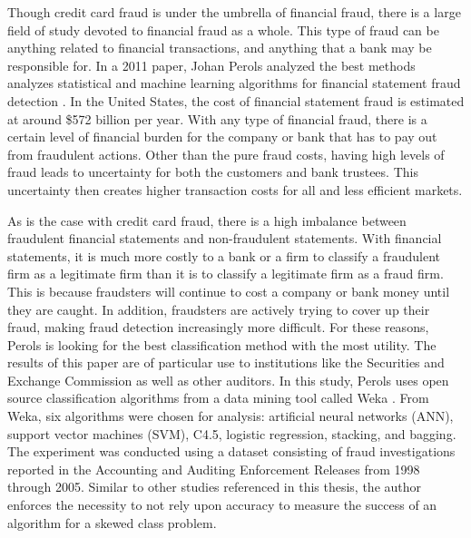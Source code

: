 \documentclass[midd]{thesis}
\begin{document}
Though credit card fraud is under the umbrella of financial fraud, there is a large field of study devoted to financial fraud as a whole. This type of fraud can be anything related to financial transactions, and anything that a bank may be responsible for. In a 2011 paper, Johan Perols analyzed the best methods analyzes statistical and machine learning algorithms for financial statement fraud detection \cite{Perols2011}. In the United States, the cost of financial statement fraud is estimated at around \$572 billion per year. With any type of financial fraud, there is a certain level of financial burden for the company or bank that has to pay out from fraudulent actions. Other than the pure fraud costs, having high levels of fraud leads to uncertainty for both the customers and bank trustees. This uncertainty then creates higher transaction costs for all and less efficient markets. 

As is the case with credit card fraud, there is a high imbalance between fraudulent financial statements and non-fraudulent statements. With financial statements, it is much more costly to a bank or a firm to classify a fraudulent firm as a legitimate firm than it is to classify a legitimate firm as a fraud firm. This is because fraudsters will continue to cost a company or bank money until they are caught. In addition, fraudsters are actively trying to cover up their fraud, making fraud detection increasingly more difficult. For these reasons, Perols is looking for the best classification method with the most utility. The results of this paper are of particular use to institutions like the Securities and Exchange Commission as well as other auditors. In this study, Perols uses open source classification algorithms from a data mining tool called Weka \cite{Perols2011}. From Weka, six algorithms were chosen for analysis: artificial neural networks (ANN), support vector machines (SVM), C4.5, logistic regression, stacking, and bagging. The experiment was conducted using a dataset consisting of fraud investigations reported in the Accounting and Auditing Enforcement Releases from 1998 through 2005. Similar to other studies referenced in this thesis, the author enforces the necessity to not rely upon accuracy to measure the success of an algorithm for a skewed class problem. 
\end{document}
